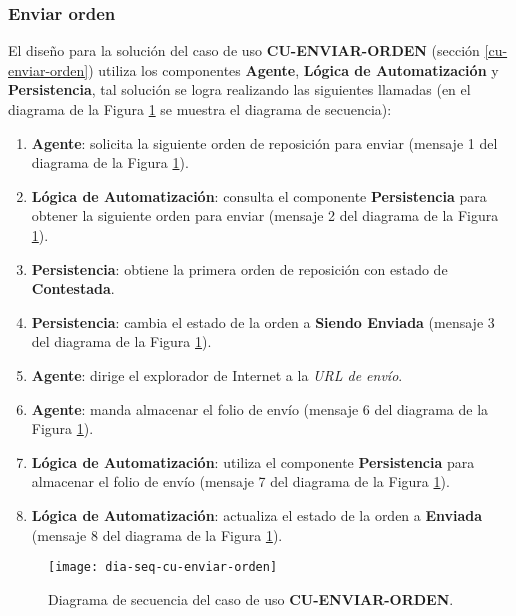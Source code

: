\subsubsection{Enviar orden}
El diseño para la solución del caso de uso \textbf{CU-ENVIAR-ORDEN} (sección \ref{cu-enviar-orden}) utiliza los componentes \textbf{Agente}, \textbf{Lógica de Automatización} y \textbf{Persistencia}, tal solución se logra realizando las siguientes llamadas (en el diagrama de la Figura \ref{fig:dia-seq-cu-enviar-orden} se muestra el diagrama de secuencia):
\begin{enumerate}
	\item \textbf{Agente}: solicita la siguiente orden de reposición para enviar (mensaje 1 del diagrama de la Figura \ref{fig:dia-seq-cu-enviar-orden}).
	\item \textbf{Lógica de Automatización}: consulta el componente \textbf{Persistencia} para obtener la siguiente orden para enviar (mensaje 2 del diagrama de la Figura \ref{fig:dia-seq-cu-enviar-orden}).
	\item \textbf{Persistencia}: obtiene la primera orden de reposición con estado de \textbf{Contestada}.
	\item \textbf{Persistencia}: cambia el estado de la orden a \textbf{Siendo Enviada} (mensaje 3 del diagrama de la Figura \ref{fig:dia-seq-cu-enviar-orden}).
	\item \textbf{Agente}: dirige el explorador de Internet a la \textit{URL de envío}.
	\item \textbf{Agente}: manda almacenar el folio de envío (mensaje 6 del diagrama de la Figura \ref{fig:dia-seq-cu-enviar-orden}).
	\item \textbf{Lógica de Automatización}: utiliza el componente \textbf{Persistencia} para almacenar el folio de envío (mensaje 7 del diagrama de la Figura \ref{fig:dia-seq-cu-enviar-orden}).
	\item \textbf{Lógica de Automatización}: actualiza el estado de la orden a \textbf{Enviada} (mensaje 8 del diagrama de la Figura \ref{fig:dia-seq-cu-enviar-orden}).
\end{enumerate}

\begin{figure}[h]
	\centering
	\texttt{[image: dia-seq-cu-enviar-orden]}
	\caption{Diagrama de secuencia del caso de uso \textbf{CU-ENVIAR-ORDEN}.}
	\label{fig:dia-seq-cu-enviar-orden}
\end{figure}

